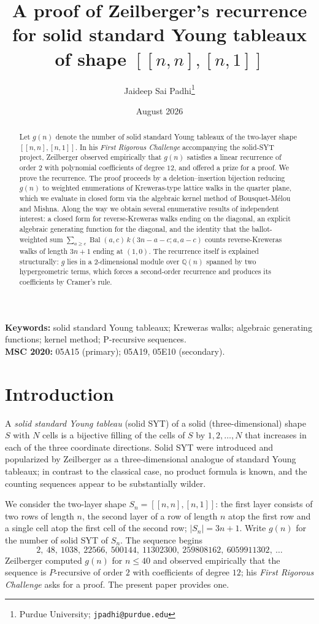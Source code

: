 \documentclass[11pt]{article}
\title{A proof of Zeilberger's recurrence for solid standard Young tableaux\\ of shape $[[n,n],[n,1]]$}
\author{Jaideep Sai Padhi\thanks{Purdue University; \texttt{jpadhi@purdue.edu}}}
\date{August 2026}
\newcommand{\Bal}{\operatorname{Bal}}
\begin{document}
\maketitle
\noindent\textbf{Keywords:} solid standard Young tableaux; Kreweras walks; algebraic generating functions; kernel method; P-recursive sequences.\\
\textbf{MSC 2020:} 05A15 (primary); 05A19, 05E10 (secondary).

\begin{abstract}
Let $g(n)$ denote the number of solid standard Young tableaux of the two-layer shape $[[n,n],[n,1]]$. In his \emph{First Rigorous Challenge} accompanying the solid-SYT project, Zeilberger observed empirically that $g(n)$ satisfies a linear recurrence of order $2$ with polynomial coefficients of degree $12$, and offered a prize for a proof. We prove the recurrence. The proof proceeds by a deletion--insertion bijection reducing $g(n)$ to weighted enumerations of Kreweras-type lattice walks in the quarter plane, which we evaluate in closed form via the algebraic kernel method of Bousquet-M\'elou and Mishna. Along the way we obtain several enumerative results of independent interest: a closed form for reverse-Kreweras walks ending on the diagonal, an explicit algebraic generating function for the diagonal, and the identity that the ballot-weighted sum $\sum_{a\ge c}\Bal(a,c)\,k(3n-a-c;a,a-c)$ counts reverse-Kreweras walks of length $3n+1$ ending at $(1,0)$. The recurrence itself is explained structurally: $g$ lies in a $2$-dimensional module over $\mathbb{Q}(n)$ spanned by two hypergeometric terms, which forces a second-order recurrence and produces its coefficients by Cramer's rule.
\end{abstract}

\section{Introduction}
A \emph{solid standard Young tableau} (solid SYT) of a solid (three-dimensional) shape $S$ with $N$ cells is a bijective filling of the cells of $S$ by $1,2,\dots,N$ that increases in each of the three coordinate directions. Solid SYT were introduced and popularized by Zeilberger as a three-dimensional analogue of standard Young tableaux; in contrast to the classical case, no product formula is known, and the counting sequences appear to be substantially wilder.

We consider the two-layer shape $S_n = [[n,n],[n,1]]$: the first layer consists of two rows of length $n$, the second layer of a row of length $n$ atop the first row and a single cell atop the first cell of the second row; $|S_n| = 3n+1$. Write $g(n)$ for the number of solid SYT of $S_n$. The sequence begins
\[ 2,\ 48,\ 1038,\ 22566,\ 500144,\ 11302300,\ 259808162,\ 6059911302,\ \dots \]
Zeilberger computed $g(n)$ for $n\le 40$ and observed empirically that the sequence is $P$-recursive of order $2$ with coefficients of degree $12$; his \emph{First Rigorous Challenge} asks for a proof. The present paper provides one.
\end{document}
